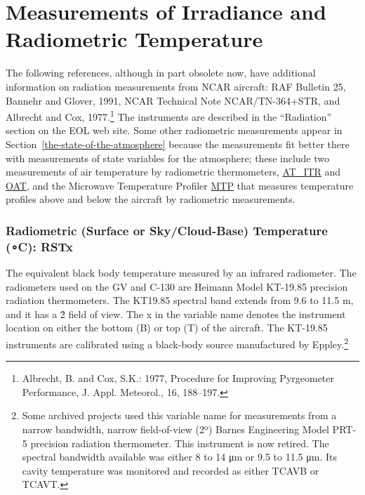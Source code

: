 \documentclass[
]{book}
\begin{document}
\hypertarget{measurements-of-irradiance-and-radiometric-temperature}{%
\section{Measurements of Irradiance and Radiometric Temperature}\label{measurements-of-irradiance-and-radiometric-temperature}}

The following references, although in part obsolete now, have additional information on radiation measurements from NCAR aircraft: RAF Bulletin 25, Bannehr and Glover, 1991, NCAR Technical Note NCAR/TN-364+STR, and Albrecht and Cox, 1977.\footnote{Albrecht, B. and Cox, S.K.: 1977, Procedure for Improving Pyrgeometer Performance, J. Appl. Meteorol., 16, 188--197.}
The instruments are described in the ``Radiation'' section on the EOL web site. Some other radiometric measurements appear in Section~\ref{the-state-of-the-atmosphere} because the measurements fit better there with measurements of state variables for the atmosphere; these include two measurements of air temperature by radiometric thermometers, \protect\hyperlink{AT_ITR}{AT\_ITR} and \protect\hyperlink{OAT}{OAT}, and the Microwave Temperature Profiler \href{http://www.eol.ucar.edu/instruments/microwave-temperature-profiler}{MTP} that measures temperature profiles above and below the aircraft by radiometric measurements.

\hypertarget{rstx}{%
\subsubsection*{\texorpdfstring{Radiometric (Surface or Sky/Cloud-Base) Temperature ({∘C}): RSTx}{Radiometric (Surface or Sky/Cloud-Base) Temperature (∘C): RSTx}}\label{rstx}}

The equivalent black body temperature measured by an infrared radiometer. The radiometers used on the GV and C-130 are Heimann Model KT-19.85 precision radiation thermometers. The KT19.85 spectral band extends from 9.6 to 11.5 m, and it has a 2̊ field of view. The x in the variable name denotes the instrument location on either the bottom (B) or top (T) of the aircraft. The KT-19.85 instruments are calibrated using a black-body source manufactured by Eppley.\footnote{Some archived projects used this variable name for measurements from a narrow bandwidth, narrow field-of-view (2{º}) Barnes Engineering Model PRT-5 precision radiation thermometer. This instrument is now retired. The spectral bandwidth available was either 8 to 14 {μm} or 9.5 to 11.5 {μm}. Its cavity temperature was monitored and recorded as either TCAVB or TCAVT.}
\end{document}
